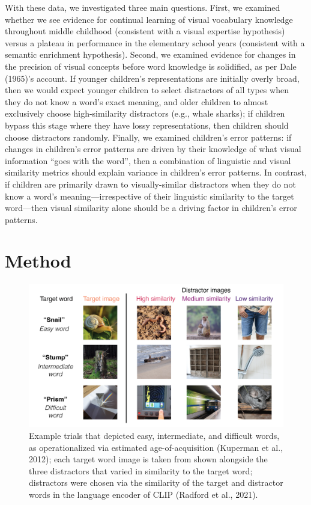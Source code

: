 \documentclass[
  man,mask]{apa6}
\begin{document}
With these data, we investigated three main questions. First, we examined whether we see evidence for continual learning of visual vocabulary knowledge throughout middle childhood (consistent with a visual expertise hypothesis) versus a plateau in performance in the elementary school years (consistent with a semantic enrichment hypothesis). Second, we examined evidence for changes in the precision of visual concepts before word knowledge is solidified, as per Dale (1965)'s account. If younger children's representations are initially overly broad, then we would expect younger children to select distractors of all types when they do not know a word's exact meaning, and older children to almost exclusively choose high-similarity distractors (e.g., whale sharks); if children bypass this stage where they have lossy representations, then children should choose distractors randomly. Finally, we examined children's error patterns: if changes in children's error patterns are driven by their knowledge of what visual information ``goes with the word'', then a combination of linguistic and visual similarity metrics should explain variance in children's error patterns. In contrast, if children are primarily drawn to visually-similar distractors when they do not know a word's meaning---irrespective of their linguistic similarity to the target word---then visual similarity alone should be a driving factor in children's error patterns.

\section{Method}\label{method}

\begin{figure}[H]

{\centering \includegraphics[width=1\linewidth]{figures/fig1_stimuli} 

}

\caption{Example trials that depicted easy, intermediate, and difficult words, as operationalized via estimated age-of-acquisition (Kuperman et al., 2012); each target word image is taken from shown alongside the three distractors that varied in similarity to the target word; distractors were chosen via the similarity of the target and distractor words in the language encoder of CLIP (Radford et al., 2021). }\label{fig:procedure-figure}
\end{figure}
\end{document}
